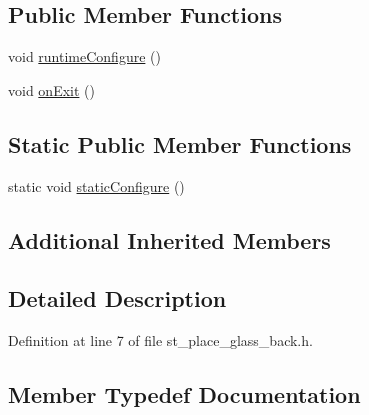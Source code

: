 \subsection*{Public Member Functions}
\begin{DoxyCompactItemize}
\item 
void \hyperlink{structsm__moveit__wine__serve_1_1StPlaceGlassBack_a98016cd6d5f302b6ccc2f71a1b7c2f18}{runtime\+Configure} ()
\item 
void \hyperlink{structsm__moveit__wine__serve_1_1StPlaceGlassBack_a49d2a83c443cfe5de54d90c94775f539}{on\+Exit} ()
\end{DoxyCompactItemize}
\subsection*{Static Public Member Functions}
\begin{DoxyCompactItemize}
\item 
static void \hyperlink{structsm__moveit__wine__serve_1_1StPlaceGlassBack_a2a2c4ea167f240ae46b8cd7eeda02783}{static\+Configure} ()
\end{DoxyCompactItemize}
\subsection*{Additional Inherited Members}


\subsection{Detailed Description}


Definition at line 7 of file st\+\_\+place\+\_\+glass\+\_\+back.\+h.



\subsection{Member Typedef Documentation}
\mbox{\label{structsm__moveit__wine__serve_1_1StPlaceGlassBack_a12d89a7779d3053752cc5587c812fd1b}} 
